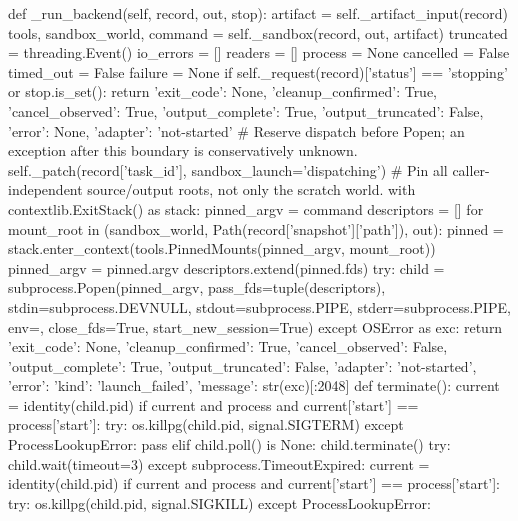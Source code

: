     def _run_backend(self, record, out, stop):
        artifact = self._artifact_input(record)
        tools, sandbox_world, command = self._sandbox(record, out, artifact)
        truncated = threading.Event()
        io_errors = []
        readers = []
        process = None
        cancelled = False
        timed_out = False
        failure = None
        if self._request(record)['status'] == 'stopping' or stop.is_set():
            return {'exit_code': None, 'cleanup_confirmed': True, 'cancel_observed': True,
                    'output_complete': True, 'output_truncated': False, 'error': None, 'adapter': 'not-started'}
        # Reserve dispatch before Popen; an exception after this boundary is conservatively unknown.
        self._patch(record['task_id'], sandbox_launch='dispatching')
        # Pin all caller-independent source/output roots, not only the scratch world.
        with contextlib.ExitStack() as stack:
            pinned_argv = command
            descriptors = []
            for mount_root in (sandbox_world, Path(record['snapshot']['path']), out):
                pinned = stack.enter_context(tools.PinnedMounts(pinned_argv, mount_root))
                pinned_argv = pinned.argv
                descriptors.extend(pinned.fds)
            try:
                child = subprocess.Popen(pinned_argv, pass_fds=tuple(descriptors), stdin=subprocess.DEVNULL,
                                         stdout=subprocess.PIPE, stderr=subprocess.PIPE, env={}, close_fds=True,
                                         start_new_session=True)
            except OSError as exc:
                return {'exit_code': None, 'cleanup_confirmed': True, 'cancel_observed': False,
                        'output_complete': True, 'output_truncated': False, 'adapter': 'not-started',
                        'error': {'kind': 'launch_failed', 'message': str(exc)[:2048]}}
        def terminate():
            current = identity(child.pid)
            if current and process and current['start'] == process['start']:
                try:
                    os.killpg(child.pid, signal.SIGTERM)
                except ProcessLookupError:
                    pass
            elif child.poll() is None:
                child.terminate()
            try:
                child.wait(timeout=3)
            except subprocess.TimeoutExpired:
                current = identity(child.pid)
                if current and process and current['start'] == process['start']:
                    try:
                        os.killpg(child.pid, signal.SIGKILL)
                    except ProcessLookupError:
